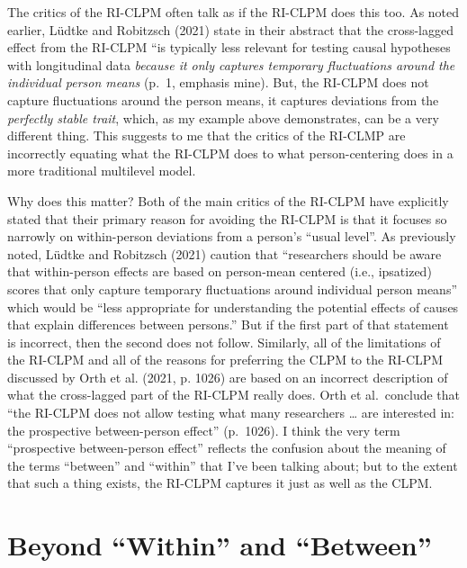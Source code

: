 \documentclass[
  english,
  man,floatsintext]{apa6}
\begin{document}
The critics of the RI-CLPM often talk as if the RI-CLPM does this too. As noted earlier, Lüdtke and Robitzsch (2021) state in their abstract that the cross-lagged effect from the RI-CLPM ``is typically less relevant for testing causal hypotheses with longitudinal data \emph{because it only captures temporary fluctuations around the individual person means} (p.~1, emphasis mine). But, the RI-CLPM does not capture fluctuations around the person means, it captures deviations from the \emph{perfectly stable trait}, which, as my example above demonstrates, can be a very different thing. This suggests to me that the critics of the RI-CLMP are incorrectly equating what the RI-CLPM does to what person-centering does in a more traditional multilevel model.

Why does this matter? Both of the main critics of the RI-CLPM have explicitly stated that their primary reason for avoiding the RI-CLPM is that it focuses so narrowly on within-person deviations from a person's ``usual level''. As previously noted, Lüdtke and Robitzsch (2021) caution that ``researchers should be aware that within-person effects are based on person-mean centered (i.e., ipsatized) scores that only capture temporary fluctuations around individual person means'' which would be ``less appropriate for understanding the potential effects of causes that explain differences between persons.'' But if the first part of that statement is incorrect, then the second does not follow. Similarly, all of the limitations of the RI-CLPM and all of the reasons for preferring the CLPM to the RI-CLPM discussed by Orth et al. (2021, p. 1026) are based on an incorrect description of what the cross-lagged part of the RI-CLPM really does. Orth et al.~conclude that ``the RI-CLPM does not allow testing what many researchers \ldots{} are interested in: the prospective between-person effect'' (p.~1026). I think the very term ``prospective between-person effect'' reflects the confusion about the meaning of the terms ``between'' and ``within'' that I've been talking about; but to the extent that such a thing exists, the RI-CLPM captures it just as well as the CLPM.

\hypertarget{beyond-within-and-between}{%
\section{Beyond ``Within'' and ``Between''}\label{beyond-within-and-between}}
\end{document}
